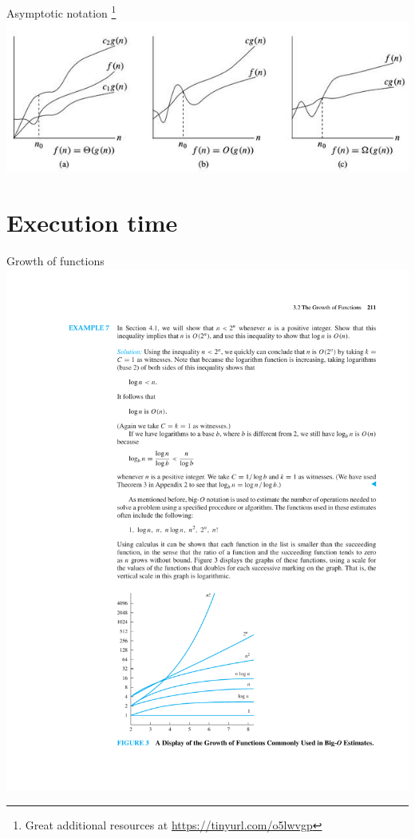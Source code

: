 \documentclass{beamer}
\theoremstyle{definition}
\begin{document}
\begin{frame}{Asymptotic notation \footnote{Great additional resources at \url{https://tinyurl.com/o5lwvgp}}}
    \centering \includegraphics[width=0.8\linewidth]{notations}
\end{frame}

\section{Execution time}

\begin{frame}{Growth of functions}
    \centering \includegraphics[trim={2cm 3cm 6cm 17cm},clip,width=\linewidth]{p211}
\end{frame}
\end{document}

